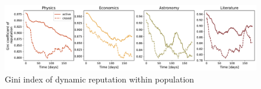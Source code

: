
\begin{figure}[h!]
	\centering
	\includegraphics[width=1\linewidth]{figures/stackexchange/gini.pdf}
	\caption{Gini index of dynamic reputation within population}
	\label{fig:dynrep-gini}
\end{figure}



